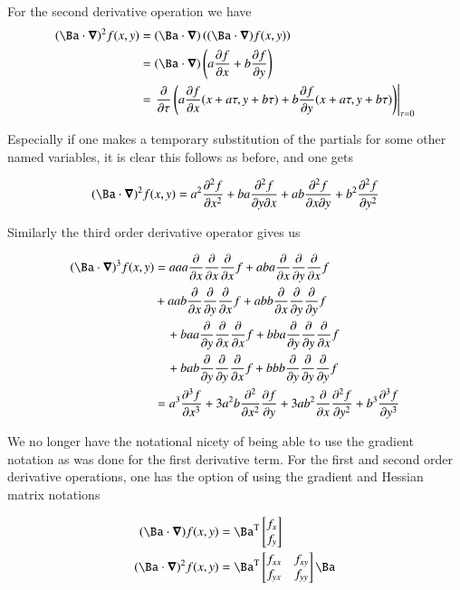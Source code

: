 \documentclass{article}
\newcommand{\PDSq}[2]{\frac{\partial^2 {#2}}{\partial {#1}^2}}
\newcommand{\transpose}[1]{{#1}^{\mathrm{T}}}
\begin{document}
For the second derivative operation we have
\begin{align*}
(\Ba \cdot \spacegrad)^2 f(x,y) 
&=
(\Ba \cdot \spacegrad) 
\left( (\Ba \cdot \spacegrad) f(x,y) \right) \\
&=
(\Ba \cdot \spacegrad) \left( a \PD{x}{f} +b \PD{y}{f} \right) \\
&= \left. \PD{\tau}{} \left( a \PD{x}{f}(x + a\tau, y + b\tau) + b \PD{y}{f}(x + a\tau, y + b\tau) \right) \right\vert_{\tau=0} \\
\end{align*}

Especially if one makes a temporary substitution of the partials for some other named variables, it is clear this follows as 
before, and one gets

\begin{align*}
(\Ba \cdot \spacegrad)^2 f(x,y) 
&=
a^2 \PDSq{x}{f} + b a \PDD{y}{x}{f} 
+a b \PDD{x}{y}{f} + b^2 \PDSq{y}{f} \\
\end{align*}

Similarly the third order derivative operator gives us

\begin{align*}
(\Ba \cdot \spacegrad)^3 f(x,y) 
&=
a a a \PD{x}{}\PD{x}{}\PD{x}{} f + a b a \PD{x}{}\PD{y}{}\PD{x}{}{f}  \\
\quad&+a a b \PD{x}{}\PD{y}{}\PD{x}{} f + a b b \PD{x}{}\PD{y}{}\PD{y}{}{f} \\
&\quad+b a a \PD{y}{}\PD{x}{}\PD{x}{} f + b b a \PD{y}{}\PD{y}{}\PD{x}{}{f} \\
&\quad+b a b \PD{y}{}\PD{y}{}\PD{x}{} f + b b b \PD{y}{}\PD{y}{}\PD{y}{}{f} \\
&=
a^3 \frac{\partial^3 f}{\partial x^3} 
+ 3 a^2 b \PDSq{x}{}\PD{y}{f}
+ 3 a b^2 \PD{x}{}\PDSq{y}{f} 
+b^3 \frac{\partial^3 f}{\partial y^3} 
\end{align*}

We no longer have the notational nicety of being able to use the gradient notation as was done for the first derivative term.  For the 
first and second order derivative operations, one has the
option of using the gradient and Hessian matrix notations

\begin{align}
(\Ba \cdot \spacegrad) f(x,y) &=
\transpose{\Ba} 
\begin{bmatrix}
f_{x} \\
f_{y} 
\end{bmatrix} 
\\
(\Ba \cdot \spacegrad)^2 f(x,y) 
&=
\transpose{\Ba} 
\begin{bmatrix}
f_{xx} & f_{xy} \\
f_{yx} & f_{yy}
\end{bmatrix}
\Ba
\end{align}
\end{document}
